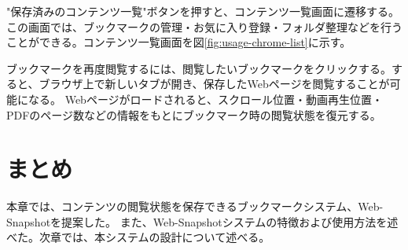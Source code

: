 "保存済みのコンテンツ一覧"ボタンを押すと、コンテンツ一覧画面に遷移する。
この画面では、ブックマークの管理・お気に入り登録・フォルダ整理などを行うことができる。コンテンツ一覧画面を図\ref{fig:usage-chrome-list}に示す。



ブックマークを再度閲覧するには、閲覧したいブックマークをクリックする。すると、ブラウザ上で新しいタブが開き、保存したWebページを閲覧することが可能になる。
Webページがロードされると、スクロール位置・動画再生位置・PDFのページ数などの情報をもとにブックマーク時の閲覧状態を復元する。

\section{まとめ}
本章では、コンテンツの閲覧状態を保存できるブックマークシステム、Web-Snapshotを提案した。
また、Web-Snapshotシステムの特徴および使用方法を述べた。次章では、本システムの設計について述べる。

